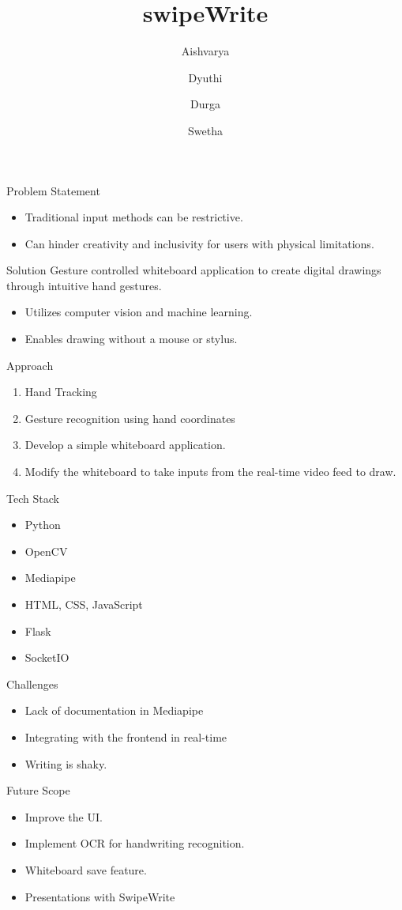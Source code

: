 \documentclass[10pt,aspectratio=169]{beamer}
\title{swipeWrite}
\date{}
\author{
  Aishvarya \and
  Dyuthi \and
  Durga \and
  Swetha
}
\begin{document}
\maketitle

\begin{frame}{Problem Statement}
  \begin{itemize}
    \item Traditional input methods can be restrictive.
    \item Can hinder creativity and inclusivity for users with physical limitations.
  \end{itemize}
\end{frame}

\begin{frame}{Solution}
  Gesture controlled whiteboard application to create digital drawings through intuitive hand gestures.
  \begin{itemize}
    \item Utilizes computer vision and machine learning.
    \item Enables drawing without a mouse or stylus.
  \end{itemize}
\end{frame}

\begin{frame}{Approach}
  \begin{enumerate}
    \item Hand Tracking 
    \item Gesture recognition using hand coordinates 
    \item Develop a simple whiteboard application.
    \item Modify the whiteboard to take inputs from the real-time video feed to draw.
  \end{enumerate}
\end{frame}

\begin{frame}{Tech Stack}
  \begin{itemize}
    \item Python
    \item OpenCV
    \item Mediapipe
    \item HTML, CSS, JavaScript
    \item Flask
    \item SocketIO
  \end{itemize}
\end{frame}

\begin{frame}{Challenges}
  \begin{itemize}
    \item Lack of documentation in Mediapipe
    \item Integrating with the frontend in real-time 
    \item Writing is shaky.
  \end{itemize}
\end{frame}

\begin{frame}{Future Scope}
  \begin{itemize}
    \item Improve the UI.
    \item Implement OCR for handwriting recognition.
    \item Whiteboard save feature.
    \item Presentations with SwipeWrite 
  \end{itemize}
\end{frame}
\end{document}
